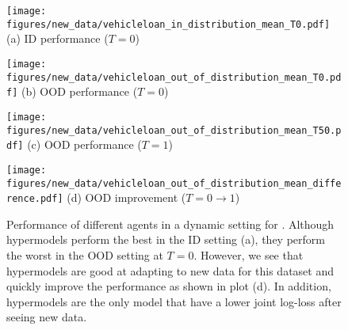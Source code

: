 \begin{figure}[h]
\centering
\begin{minipage}[b]{0.24\textwidth}
\centering
\texttt{[image: figures/new\_data/vehicleloan\_in\_distribution\_mean\_T0.pdf]}
{\small{{(a)} ID performance ($T=0$) }} 
\end{minipage}
\hfill
\begin{minipage}[b]{0.24\textwidth}
\centering \texttt{[image: figures/new\_data/vehicleloan\_out\_of\_distribution\_mean\_T0.pdf]}
{\small{{(b)} OOD performance ($T=0$) }} 
\end{minipage}
\hfill
\begin{minipage}[b]{0.24\textwidth}
\centering \texttt{[image: figures/new\_data/vehicleloan\_out\_of\_distribution\_mean\_T50.pdf]}
{\small{{(c)} OOD performance ($T=1$) }}
\end{minipage}
\hfill
\begin{minipage}[b]{0.24\textwidth}
\centering \texttt{[image: figures/new\_data/vehicleloan\_out\_of\_distribution\_mean\_difference.pdf]}
{\small{{(d)} OOD improvement ($T=0 \to 1$) }}
\end{minipage}
\caption{Performance of different agents in a dynamic setting for \vehicleloan.
Although hypermodels perform the best in the ID setting (a), they perform the worst in the OOD setting at $T=0$. However, we see that hypermodels are good at adapting to new data for this dataset and quickly improve the performance as shown in plot (d). In addition, hypermodels are the only model that have a lower joint log-loss after seeing new data.
}
\label{fig:dynamic_setting_vehicleloan}
\end{figure}





